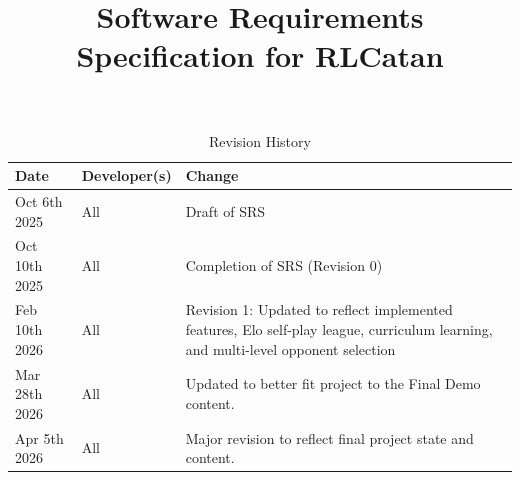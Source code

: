 \documentclass{article}
\title{Software Requirements Specification for RLCatan\\\progname}
\author{\authname}
\date{}
\begin{document}
\maketitle

\tableofcontents

\listoftables

\listoffigures

\newpage

\begin{table}[hp]
\caption{Revision History} \label{TblRevisionHistory}
\begin{tabularx}{\textwidth}{llX}
\toprule
\textbf{Date} & \textbf{Developer(s)} & \textbf{Change}\\
\midrule
Oct 6th 2025& All & Draft of SRS\\
Oct 10th 2025 & All & Completion of SRS (Revision 0)\\
Feb 10th 2026 & All & Revision 1: Updated to reflect implemented features, Elo self-play league, curriculum learning, and multi-level opponent selection\\
Mar 28th 2026 & All & Updated to better fit project to the Final Demo content. \\
Apr 5th 2026 & All & Major revision to reflect final project state and content. \\
\bottomrule
\end{tabularx}
\end{table}
\end{document}
